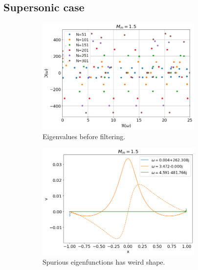 \documentclass{article}
\begin{document}
    \subsection*{Supersonic case}
    \begin{figure}[H]
        \centering
        \begin{subfigure}[b]{0.5\textwidth}
            \includegraphics*[width=0.9\textwidth]{img/eigvals-Mm=1.5.png}
            \caption{Eigenvalues before filtering.}
        \end{subfigure}%
        \begin{subfigure}[b]{0.5\textwidth}
            \includegraphics*[width=0.9\textwidth]{img/eigfuncs-Mm=1.5.png}
            \caption{Spurious eigenfunctions has weird shape.}
        \end{subfigure}
        \begin{subfigure}[b]{0.5\textwidth}

\end{subfigure}
\end{figure}
\end{document}
